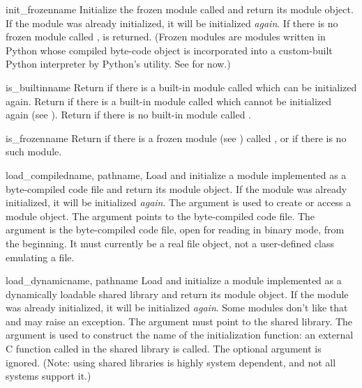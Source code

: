 \begin{funcdesc}{init_frozen}{name}
Initialize the frozen module called  and return its module
object.  If the module was already initialized, it will be initialized
\emph{again}.  If there is no frozen module called ,
 is returned.  (Frozen modules are modules written in
Python whose compiled byte-code object is incorporated into a
custom-built Python interpreter by Python's  utility.
See  for now.)
\end{funcdesc}

\begin{funcdesc}{is_builtin}{name}
Return  if there is a built-in module called  which
can be initialized again.  Return  if there is a built-in
module called  which cannot be initialized again (see
).  Return  if there is no built-in
module called .
\end{funcdesc}

\begin{funcdesc}{is_frozen}{name}
Return  if there is a frozen module (see
) called , or  if there is
no such module.
\end{funcdesc}

\begin{funcdesc}{load_compiled}{name, pathname, }
Load and initialize a module implemented as a byte-compiled code file
and return its module object.  If the module was already initialized,
it will be initialized \emph{again}.  The  argument is used
to create or access a module object.  The  argument
points to the byte-compiled code file.  The 
argument is the byte-compiled code file, open for reading in binary
mode, from the beginning.
It must currently be a real file object, not a
user-defined class emulating a file.
\end{funcdesc}

\begin{funcdesc}{load_dynamic}{name, pathname}
Load and initialize a module implemented as a dynamically loadable
shared library and return its module object.  If the module was
already initialized, it will be initialized \emph{again}.  Some modules
don't like that and may raise an exception.  The 
argument must point to the shared library.  The  argument is
used to construct the name of the initialization function: an external
C function called  in the shared library is
called.  The optional  argument is ignored.  (Note: using
shared libraries is highly system dependent, and not all systems
support it.)
\end{funcdesc}

